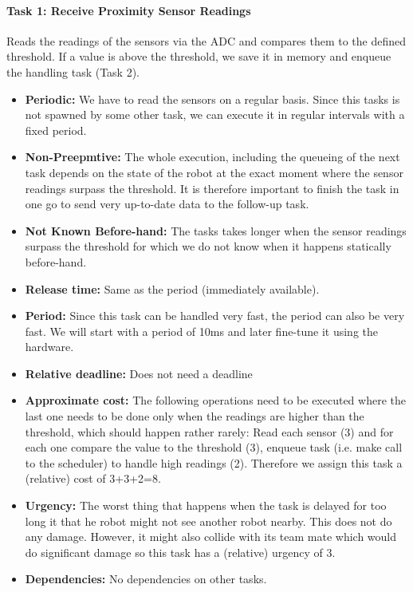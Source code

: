 \documentclass[12pt]{article}
\begin{document}
\paragraph{Task 1: Receive Proximity Sensor Readings}
Reads the readings of the sensors via the ADC and compares them to the defined threshold. If a value is above the threshold, we save it in memory and enqueue the handling task (Task 2).
  	\begin{itemize}
  	\item \textbf{Periodic:} We have to read the sensors on a regular basis. Since this tasks is not spawned by some other task, we can execute it in regular intervals with a fixed period.
	\item \textbf{Non-Preepmtive:} The whole execution, including the queueing of the next task depends on the state of the robot at the exact moment where the sensor readings surpass the threshold. It is therefore important to finish the task in one go to send very up-to-date data to the follow-up task.
  	\item \textbf{Not Known Before-hand:} The tasks takes longer when the sensor readings surpass the threshold for which we do not know when it happens statically before-hand.
  	\item \textbf{Release time:} Same as the period (immediately available).
  	\item \textbf{Period:} Since this task can be handled very fast, the period can also be very fast. We will start with a period of 10ms and later fine-tune it using the hardware.
  	\item \textbf{Relative deadline:} Does not need a deadline
  	\item \textbf{Approximate cost:} The following operations need to be executed where the last one needs to be done only when the readings are higher than the threshold, which should happen rather rarely: Read each sensor (3) and for each one compare the value to the threshold (3), enqueue task (i.e. make call to the scheduler) to handle high readings (2). Therefore we assign this task a (relative) cost of 3+3+2=8.
  	\item \textbf{Urgency:} The worst thing that happens when the task is delayed for too long it that he robot might not see another robot nearby. This does not do any damage. However, it might also collide with its team mate which would do significant damage so this task has a (relative) urgency of 3.
  	\item \textbf{Dependencies:} No dependencies on other tasks.
  	\end{itemize}
\end{document}
